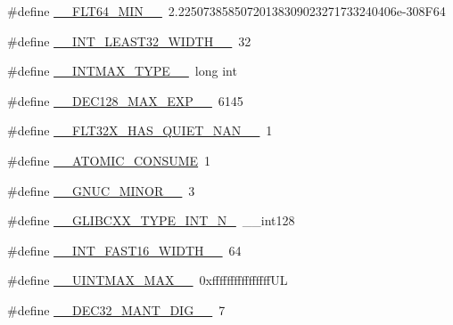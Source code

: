 \begin{DoxyCompactItemize}
\#define \hyperlink{cmake-build-debug_2babel__client__autogen_2moc__predefs_8h_a56e81e5fec09084ed0e8ed0cccddf3a0}{\+\_\+\+\_\+\+F\+L\+T64\+\_\+\+M\+I\+N\+\_\+\+\_\+}~2.\+22507385850720138309023271733240406e-\/308\+F64
\item 
\#define \hyperlink{cmake-build-debug_2babel__client__autogen_2moc__predefs_8h_a0a54ad5275069482576a8e26197c01db}{\+\_\+\+\_\+\+I\+N\+T\+\_\+\+L\+E\+A\+S\+T32\+\_\+\+W\+I\+D\+T\+H\+\_\+\+\_\+}~32
\item 
\#define \hyperlink{cmake-build-debug_2babel__client__autogen_2moc__predefs_8h_ad3062ff83239e8dd2b8969a2f368d608}{\+\_\+\+\_\+\+I\+N\+T\+M\+A\+X\+\_\+\+T\+Y\+P\+E\+\_\+\+\_\+}~long int
\item 
\#define \hyperlink{cmake-build-debug_2babel__client__autogen_2moc__predefs_8h_aab1edcef0b79684e5d2f12a2696e260f}{\+\_\+\+\_\+\+D\+E\+C128\+\_\+\+M\+A\+X\+\_\+\+E\+X\+P\+\_\+\+\_\+}~6145
\item 
\#define \hyperlink{cmake-build-debug_2babel__client__autogen_2moc__predefs_8h_a158b9e85a96f0cf9698a6202071e8061}{\+\_\+\+\_\+\+F\+L\+T32\+X\+\_\+\+H\+A\+S\+\_\+\+Q\+U\+I\+E\+T\+\_\+\+N\+A\+N\+\_\+\+\_\+}~1
\item 
\#define \hyperlink{cmake-build-debug_2babel__client__autogen_2moc__predefs_8h_a762c3361bcfeccc1f2742cc94b1ab65b}{\+\_\+\+\_\+\+A\+T\+O\+M\+I\+C\+\_\+\+C\+O\+N\+S\+U\+ME}~1
\item 
\#define \hyperlink{cmake-build-debug_2babel__client__autogen_2moc__predefs_8h_a0b8ad52bece225cdae9c1b46c91c62a5}{\+\_\+\+\_\+\+G\+N\+U\+C\+\_\+\+M\+I\+N\+O\+R\+\_\+\+\_\+}~3
\item 
\#define \hyperlink{cmake-build-debug_2babel__client__autogen_2moc__predefs_8h_a6e1c7832e61ad4da9c2487d38fdb1773}{\+\_\+\+\_\+\+G\+L\+I\+B\+C\+X\+X\+\_\+\+T\+Y\+P\+E\+\_\+\+I\+N\+T\+\_\+\+N\+\_}~\+\_\+\+\_\+int128
\item 
\#define \hyperlink{cmake-build-debug_2babel__client__autogen_2moc__predefs_8h_a65ff7d0e95dab0167cbd46d117cfa74a}{\+\_\+\+\_\+\+I\+N\+T\+\_\+\+F\+A\+S\+T16\+\_\+\+W\+I\+D\+T\+H\+\_\+\+\_\+}~64
\item 
\#define \hyperlink{cmake-build-debug_2babel__client__autogen_2moc__predefs_8h_a36b3a5bf25feeef4fbdca37900522f3c}{\+\_\+\+\_\+\+U\+I\+N\+T\+M\+A\+X\+\_\+\+M\+A\+X\+\_\+\+\_\+}~0xffffffffffffffff\+UL
\item 
\#define \hyperlink{cmake-build-debug_2babel__client__autogen_2moc__predefs_8h_a144dfa169f604d99b46658c15338338e}{\+\_\+\+\_\+\+D\+E\+C32\+\_\+\+M\+A\+N\+T\+\_\+\+D\+I\+G\+\_\+\+\_\+}~7

\end{DoxyCompactItemize}
